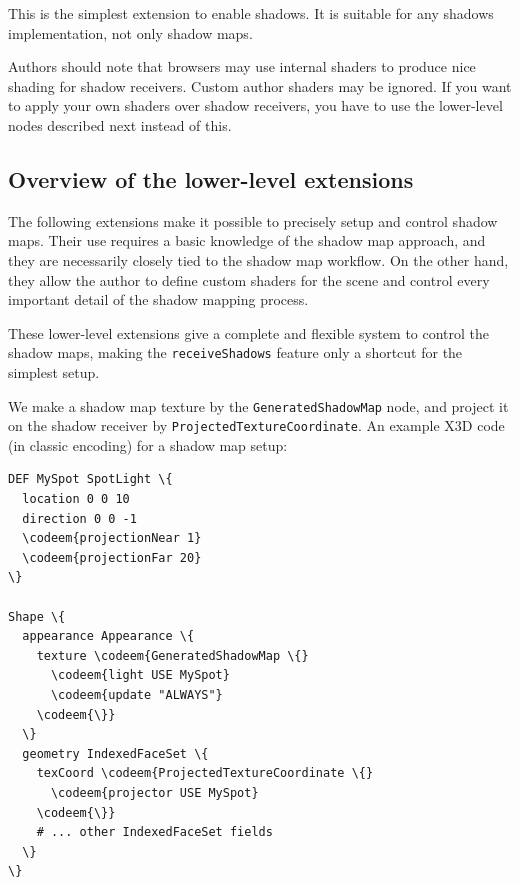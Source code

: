 \documentclass{acmsiggraph}                     %
\newcommand*{\codeem}[1]{\textbf{#1}}
\begin{document}
This is the simplest extension to enable shadows.
It is suitable for any shadows implementation, not only shadow maps.

Authors should note that browsers may use internal shaders to produce nice
shading for shadow receivers. Custom author shaders may be ignored.
If you want to apply your own shaders over shadow receivers, you have to
use the lower-level nodes described next instead of this.

\subsection{Overview of the lower-level extensions}

The following extensions make it possible to precisely setup and control
shadow maps. Their use requires a basic knowledge of the shadow map approach,
and they are necessarily closely tied to the shadow map workflow.
On the other hand, they allow the author to define custom shaders
for the scene and control every important detail of the shadow mapping process.

These lower-level extensions give a complete and flexible system to
control the shadow maps, making the \texttt{receiveShadows}
feature only a shortcut for the simplest setup.

We make a shadow map texture by the \texttt{GeneratedShadowMap} node,
and project it on the shadow receiver by
\texttt{ProjectedTextureCoordinate}.
An example X3D code (in classic encoding) for a shadow map setup:

\begin{Verbatim}[commandchars=\\\{\},frame=single]
DEF MySpot SpotLight \{
  location 0 0 10
  direction 0 0 -1
  \codeem{projectionNear 1}
  \codeem{projectionFar 20}
\}

Shape \{
  appearance Appearance \{
    texture \codeem{GeneratedShadowMap \{}
      \codeem{light USE MySpot}
      \codeem{update "ALWAYS"}
    \codeem{\}}
  \}
  geometry IndexedFaceSet \{
    texCoord \codeem{ProjectedTextureCoordinate \{}
      \codeem{projector USE MySpot}
    \codeem{\}}
    # ... other IndexedFaceSet fields
  \}
\}
\end{Verbatim}

\end{document}
